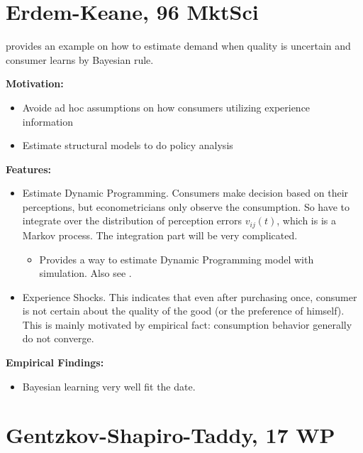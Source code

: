 \documentclass{book}
\theoremstyle{plain}
\theoremstyle{definition}
\begin{document}
\section{Erdem-Keane, 96 MktSci} %
\label{sec:erdem_keane_96_mktsci}

\textbf{}

\cite{erdem_kean:96_MngSci} provides an example on how to estimate demand when quality is uncertain and consumer learns by Bayesian rule.

\vspace{2mm}
\noindent
\textbf{Motivation:}
\begin{itemize}
	\item Avoide ad hoc assumptions on how consumers utilizing experience information
	\item Estimate structural models to do policy analysis
\end{itemize}

\noindent
\textbf{Features:}
\begin{itemize}
	\item Estimate Dynamic Programming.
	Consumers make decision based on their perceptions,
	but econometricians only observe the consumption. 
	So have to integrate over the distribution of perception errors $v_{ij}(t)$, which is is a Markov process.
	The integration part will be very complicated.
	\begin{itemize}
		\item Provides a way to estimate Dynamic Programming model with simulation. Also see \cite{keane_wolpin:94REStat}.
	\end{itemize}
	\item Experience Shocks.
	This indicates that even after purchasing once, 
	consumer is not certain about the quality of the good (or the preference of himself).
	This is mainly motivated by empirical fact: 
	consumption behavior generally do not converge.
\end{itemize}


\noindent
\textbf{Empirical Findings:}
\begin{itemize}
	\item Bayesian learning very well fit the date.

\end{itemize}




\section{Gentzkov-Shapiro-Taddy, 17 WP} %
\label{sec:gentzkov_shapiro_taddy_17_wp}
\end{document}
